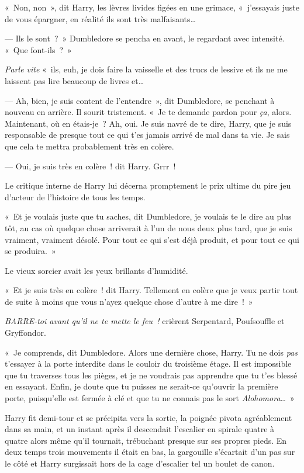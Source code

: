 «~Non, non~», dit Harry, les lèvres livides figées en une grimace, «~j'essayais juste de vous épargner, en réalité ils sont très malfaisants…

--- Ils le sont~?~»
Dumbledore se pencha en avant, le regardant avec intensité.
«~Que font-ils~?~»

\emph{Parle vite} «~ils, euh, je dois faire la vaisselle et des trucs de lessive et ils ne me laissent pas lire beaucoup de livres et…

--- Ah, bien, je suis content de l'entendre~», dit Dumbledore, se penchant à nouveau en arrière.
Il sourit tristement.
«~Je te demande pardon pour \emph{ça}, alors.
Maintenant, où en étais-je~?
Ah, oui.
Je suis navré de te dire, Harry, que je suis responsable de presque tout ce qui t'es jamais arrivé de mal dans ta vie.
Je sais que cela te mettra probablement très en colère.

--- Oui, je suis très en colère~! dit Harry.
Grrr~!

Le critique interne de Harry lui décerna promptement le prix ultime du pire jeu d'acteur de l'histoire de tous les temps.

«~Et je voulais juste que tu saches, dit Dumbledore, je voulais te le dire au plus tôt, au cas où quelque chose arriverait à l'un de nous deux plus tard, que je suis vraiment, vraiment désolé.
Pour tout ce qui s'est déjà produit, et pour tout ce qui se produira.~»

Le vieux sorcier avait les yeux brillants d'humidité.

«~Et je suis très en colère~! dit Harry.
Tellement en colère que je veux partir tout de suite à moins que vous n'ayez quelque chose d'autre à me dire~!~»

\emph{BARRE-toi avant qu'il ne te mette le feu~!} crièrent Serpentard, Poufsouffle et Gryffondor.

«~Je comprends, dit Dumbledore.
Alors une dernière chose, Harry.
Tu ne dois \emph{pas} t'essayer à la porte interdite dans le couloir du troisième étage.
Il est impossible que tu traverses tous les pièges, et je ne voudrais pas apprendre que tu t'es blessé en essayant.
Enfin, je doute que tu puisses ne serait-ce qu'ouvrir la première porte, puisqu'elle est fermée à clé et que tu ne connais pas le sort \emph{Alohomora}…~»

Harry fit demi-tour et se précipita vers la sortie, la poignée pivota agréablement dans sa main, et un instant après il descendait l'escalier en spirale quatre à quatre alors même qu'il tournait, trébuchant presque sur ses propres pieds.
En deux temps trois mouvements il était en bas, la gargouille s'écartait d'un pas sur le côté et Harry surgissait hors de la cage d'escalier tel un boulet de canon.


